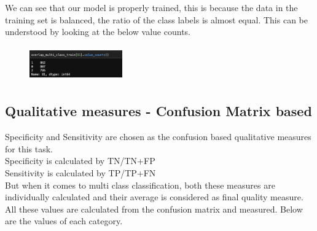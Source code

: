 \documentclass[conference]{IEEEtran}
\begin{document}
\begin{enumerate}
\begin{figure}[!htbp]
    \label{fig:my_label}
\end{figure}
We can see that our model is properly trained, this is because the data in the training set is balanced, the ratio of the class labels is almost equal. This can be understood by looking at the below value counts. \\
\begin{figure}[!htbp]
    \centering
    \includegraphics[width=4cm, height=1.5cm]{task2.16.png}
    \label{fig:my_label}
\end{figure}
\end{enumerate}

\subsection{Qualitative measures - Confusion Matrix based}
Specificity and Sensitivity are chosen as the confusion based qualitative measures for this task. \\
Specificity is calculated by TN/TN+FP \\
Sensitivity is calculated by TP/TP+FN \\
But when it comes to multi class classification, both these measures are individually calculated and their average is considered as final quality measure. \\
All these values are calculated from the confusion matrix and measured. Below are the values of each category. \\
\end{document}
